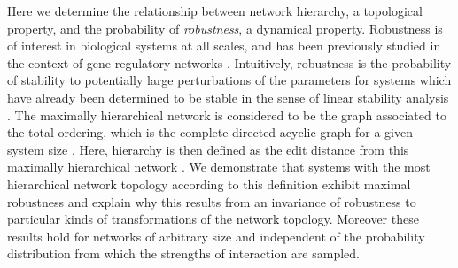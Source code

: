 
Here we determine the relationship between network hierarchy, a topological property, and the probability of \emph{robustness}, a dynamical property. Robustness is of interest in biological systems at all scales, and has been previously studied in the context of gene-regulatory networks \cite{WADDINGTON1942a,VanNimwegen1999,Siegal2002,Ciliberti2007b,Ciliberti2007,Wagner2013}. Intuitively, robustness is the probability of stability to potentially large perturbations of the parameters for systems which have already been determined to be stable in the sense of linear stability analysis \cite{Davis1962}. The maximally hierarchical network is considered to be the graph associated to the total ordering, which is the complete directed acyclic graph for a given system size \cite{Cormen2009}. Here, hierarchy is then defined as the edit distance from this maximally hierarchical network \cite{Axenovich2011}. We demonstrate that systems with the most hierarchical network topology according to this definition exhibit maximal robustness and explain why this results from an invariance of robustness to particular kinds of transformations of the network topology. Moreover these results hold for networks of arbitrary size and independent of the probability distribution from which the strengths of interaction are sampled.

